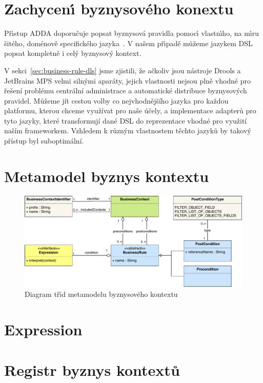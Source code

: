 \section{Zachycen\'{\i} byznysového konextu}

Př\'{\i}stup \gls{ADDA} doporučuje popsat byznysová pravidla pomoc\'{\i}
vlastn\'{\i}ho, na m\'{\i}ru šitého, doménově specifického jazyka~\cite{cemus2015automated}.
V našem př\'{\i}padě můžeme jazykem \gls{DSL} popsat kompletně i cel\'y
byznysov\'y kontext.

V sekci~\ref{sec:business-rule-dls} jsme zjistili, že ačkoliv jsou nástroje Drools a JetBrains
MPS velmi silnými aparáty, jejich vlastnosti nejsou plně vhodné pro řešení problému
centrální administrace a automatické distribuce byznysových pravidel.
Můžeme jít cestou volby co nejvhodnějšího jazyka pro každou platformu, kterou chceme
využívat pro naše účely, a implementace adapterů pro tyto jazyky, které transformují
dané \gls{DSL} do reprezentace vhodné pro využití naším frameworkem. Vzhledem k
různým vlastnostem těchto jazyků by takový přístup byl suboptimální.

\section{Metamodel byznys kontextu}\label{sec:metamodel}

\begin{figure}
    \centering
    \includegraphics[keepaspectratio=true, width=\linewidth]{figures/business-context-metamodel.pdf}
    \caption{Diagram tř\'{\i}d metamodelu byznysového kontextu}
    \label{fig:business-context-metamodel}
\end{figure} %

\section{Expression}

\section{Registr byznys kontextů}

